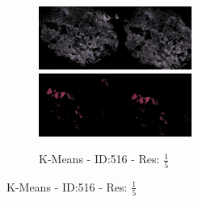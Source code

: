 \documentclass[letterpaper,10pt,oneside]{article}
\begin{document}
\begin{figure}[hbtp]
\begin{subfigure}[b]{5cm}
    \includegraphics[width=5cm]{visualization/results/kmeans/res_reduce_5/Region_0_PO13-00516A1_1_7_201305171148.png}
    \includegraphics[width=5cm]{visualization/results/kmeans/res_reduce_5/Region_1_PO13-00516A1_1_7_201305171148.png}
    \caption{K-Means - ID:516 - Res: $\frac{1}{5}$}
  \end{subfigure}
  

\end{figure}
\end{document}
